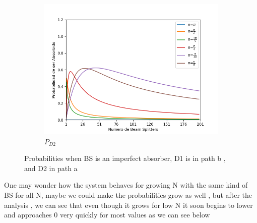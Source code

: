 \documentclass[11pt]{article}
\begin{document}
\begin{figure}[h!]
\begin{subfigure}[b]{0.45\linewidth}
\includegraphics[width=\linewidth]{absorbido_azuna.png}
\caption{$P_{D2}$}
\label{fig:BS1}
\end{subfigure}
\caption{Probabilities when BS is an imperfect absorber, D1 is in path b , and D2 in path a}
\label{fig:westminster}
\end{figure} 
\vspace{10 cm}


One may wonder how the system behaves for growing N with the same kind of BS for all N, maybe we could make the probabilities grow as well , but after the analysis , we can see that even though it grows for low N it soon begins to lower and approaches 0 very quickly for most values as we can see below
\end{document}
